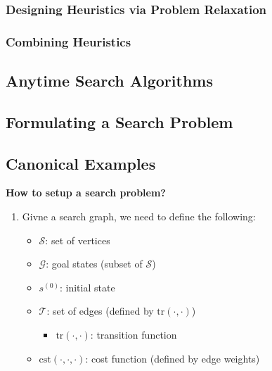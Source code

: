 \subsubsection{Designing Heuristics via Problem Relaxation}

\subsubsection{Combining Heuristics}

\subsection{Anytime Search Algorithms}

\subsection{Formulating a Search Problem}
\newpage

\subsection{Canonical Examples}
\begin{process} \textbf{How to setup a search problem?}
    \begin{enumerate}
        \item Givne a search graph, we need to define the following:
        \begin{itemize}
            \item $\mathcal{S}$: set of vertices
            \item $\mathcal{G}$: goal states (subset of $\mathcal{S}$)
            \item $s^{(0)}$: initial state
            \item $\mathcal{T}$: set of edges (defined by $\text{tr}(\cdot, \cdot)$)
            \begin{itemize}
                \item $\text{tr}(\cdot, \cdot)$: transition function
            \end{itemize}
            \item $\text{cst}(\cdot, \cdot, \cdot)$: cost function (defined by edge weights)
        \end{itemize}
    \end{enumerate}
\end{process}

\begin{example}
\end{example}
\newpage

